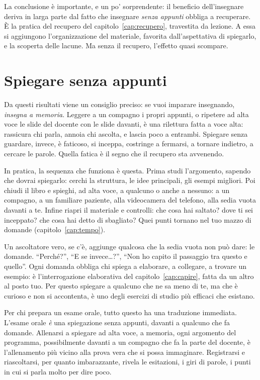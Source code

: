 La conclusione è importante, e un po' sorprendente: il beneficio
dell'insegnare deriva in larga parte dal fatto che insegnare \emph{senza
appunti} obbliga a recuperare. È la pratica del recupero del
capitolo~\ref{cap:recupero}, travestita da lezione. A essa si
aggiungono l'organizzazione del materiale, favorita dall'aspettativa di
spiegarlo, e la scoperta delle lacune. Ma senza il recupero, l'effetto
quasi scompare.

\section{Spiegare senza appunti}

Da questi risultati viene un consiglio preciso: se vuoi imparare
insegnando, \emph{insegna a memoria}. Leggere a un compagno i propri
appunti, o ripetere ad alta voce le slide del docente con le slide
davanti, è una rilettura fatta a voce alta: rassicura chi parla,
annoia chi ascolta, e lascia poco a entrambi. Spiegare senza guardare,
invece, è faticoso, si inceppa, costringe a fermarsi, a tornare
indietro, a cercare le parole. Quella fatica è il segno che il recupero
sta avvenendo.

In pratica, la sequenza che funziona è questa. Prima studi
l'argomento, sapendo che dovrai spiegarlo: cerchi la struttura, le idee
principali, gli esempi migliori. Poi chiudi il libro e spieghi, ad alta
voce, a qualcuno o anche a nessuno: a un compagno, a un familiare
paziente, alla videocamera del telefono, alla sedia vuota davanti a te.
Infine riapri il materiale e controlli: che cosa hai saltato? dove ti
sei inceppato? che cosa hai detto di sbagliato? Quei punti tornano nel
tuo mazzo di domande (capitolo~\ref{cap:tempo}).

Un ascoltatore vero, se c'è, aggiunge qualcosa che la sedia vuota non
può dare: le domande. \enquote{Perché?}, \enquote{E se invece\dots?},
\enquote{Non ho capito il passaggio tra questo e quello}. Ogni domanda
obbliga chi spiega a elaborare, a collegare, a trovare un esempio: è
l'interrogazione elaborativa del capitolo~\ref{cap:capire}, fatta da
un altro al posto tuo. Per questo spiegare a qualcuno che ne sa meno di
te, ma che è curioso e non si accontenta, è uno degli esercizi di studio
più efficaci che esistano.

Per chi prepara un esame orale, tutto questo ha una traduzione
immediata. L'esame orale \emph{è} una spiegazione senza appunti,
davanti a qualcuno che fa domande. Allenarsi a spiegare ad alta voce,
a memoria, ogni argomento del programma, possibilmente davanti a un
compagno che fa la parte del docente, è l'allenamento più vicino alla
prova vera che si possa immaginare. Registrarsi e riascoltarsi, per
quanto imbarazzante, rivela le esitazioni, i giri di parole, i punti
in cui si parla molto per dire poco.

